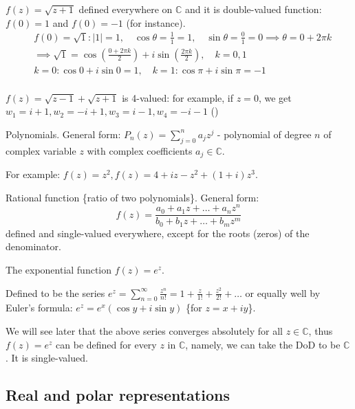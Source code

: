 \begin{example}\label{example:3.2}
     $f(z) = \sqrt{z + 1}$ defined everywhere on $\mathbb{C}$ and it is double-valued function: $f(0) = 1$ and $f(0) = -1$ (for instance).
\begin{align*}
    & f(0) = \sqrt{1}: \vert 1\vert  = 1, \quad \cos \theta = \frac{1}{1} = 1, \quad \sin \theta = \frac{0}{1} = 0 \implies \theta = 0 + 2\pi k \\
    & \implies \sqrt{1} = \cos\left(\frac{0 + 2\pi k}{2}\right) + i\sin\left(\frac{2\pi k}{2}\right), \quad k = 0, 1 \\
    & k = 0: \cos 0 + i\sin 0 = 1, \quad k = 1: \cos \pi + i\sin \pi = -1 \\
\end{align*}
\end{example}
\begin{example}\label{example:3.3}
     $f(z) = \sqrt{z - 1} + \sqrt{z + 1}$ is 4-valued: for example, if $z = 0$, we get $w_1 = i + 1, w_2 = -i + 1, w_3 = i - 1, w_4 = -i - 1$ (\verifythis)
\end{example}
\begin{example} \label{example:3.4}
     Polynomials. General form: $P_n(z) = \sum_{j=0}^{n} a_j z^j$ - polynomial of degree $n$ of complex variable $z$ with complex coefficients $a_j \in \mathbb{C}$.
\end{example}
For example: $f(z) = z^2, f(z) = 4 + iz - z^2 + (1 + i)z^3$.

\begin{example}\label{example:3.5}
    Rational function \{ratio of two polynomials\}. General form:
\[f(z) = \frac{a_0 + a_1 z + \dots + a_n z^n}{b_0 + b_1 z + \dots + b_m z^m}\]
defined and single-valued everywhere, except for the roots (zeros) of the denominator.
\end{example}
\begin{example} \label{example:3.6} The exponential function $f(z) = e^z$.

Defined to be the series $e^z = \sum_{n=0}^{\infty} \frac{z^n}{n!} = 1 + \frac{z}{1!} + \frac{z^2}{2!} + \dots$ or equally well by Euler's formula: $e^z = e^x(\cos y + i\sin y)$ \{for $z = x + iy$\}.
\end{example}
We will see later that the above series converges absolutely for all $z \in \mathbb{C}$, thus $f(z) = e^z$ can be defined for every $z$ in $\mathbb{C}$, namely, we can take the DoD to be $\mathbb{C}$. 
It is single-valued.

\subsection{Real and polar representations}


